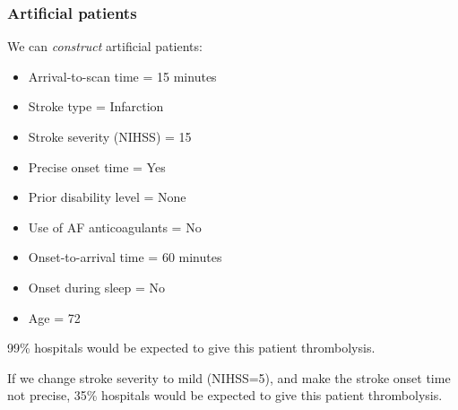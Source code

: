 \documentclass{beamer}
\begin{document}

\begin{frame}
\frametitle{Artificial patients}

We can \emph{construct} artificial patients:
\vspace{1mm}
\begin{footnotesize}
\begin{itemize}
    \item Arrival-to-scan time = 15 minutes 
    \item Stroke type  = Infarction
    \item Stroke severity (NIHSS) = 15
    \item Precise onset time = Yes
    \item Prior disability level = None
    \item Use of AF anticoagulants = No
    \item Onset-to-arrival time = 60 minutes
    \item Onset during sleep = No
    \item Age = 72
\end{itemize}
\end{footnotesize}

\vspace{2mm}

99\% hospitals would be expected to give this patient thrombolysis.

\vspace{2mm}

If we change stroke severity to mild (NIHSS=5), and make the stroke onset time not precise, 35\% hospitals would be expected to give this patient thrombolysis.

\end{frame}
\end{document}
